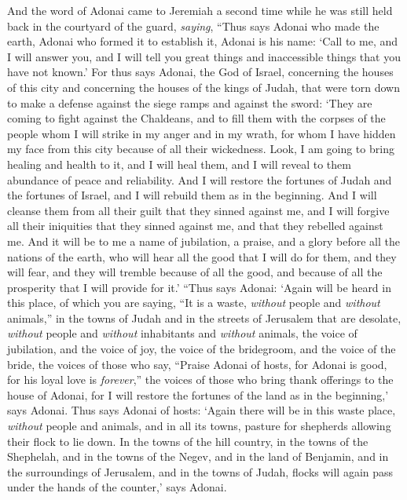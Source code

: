 \begin{biblechapter} %
 And the word of Adonai came to Jeremiah a second time while he was still held back in the courtyard of the guard, \textit{saying},
\verse “Thus says Adonai who made the earth, Adonai who formed it to establish it, Adonai is his name:
\verse ‘Call to me, and I will answer you, and I will tell you great things and inaccessible things that you have not known.’
\verse For thus says Adonai, the God of Israel, concerning the houses of this city and concerning the houses of the kings of Judah, that were torn down to make a defense against the siege ramps and against the sword:
\verse ‘They are coming to fight against the Chaldeans, and to fill them with the corpses of the people whom I will strike in my anger and in my wrath, for whom I have hidden my face from this city because of all their wickedness.
\verse Look, I am going to bring healing and health to it, and I will heal them, and I will reveal to them abundance of peace and reliability.
\verse And I will restore the fortunes of Judah and the fortunes of Israel, and I will rebuild them as in the beginning.
\verse And I will cleanse them from all their guilt that they sinned against me, and I will forgive all their iniquities that they sinned against me, and that they rebelled against me.
\verse And it will be to me a name of jubilation, a praise, and a glory before all the nations of the earth, who will hear all the good that I will do for them, and they will fear, and they will tremble because of all the good, and because of all the prosperity that I will provide for it.’
\verse “Thus says Adonai: ‘Again will be heard in this place, of which you are saying, “It is a waste, \textit{without} people and \textit{without} animals,” in the towns of Judah and in the streets of Jerusalem that are desolate, \textit{without} people and \textit{without} inhabitants and \textit{without} animals,
\verse the voice of jubilation, and the voice of joy, the voice of the bridegroom, and the voice of the bride, the voices of those who say, “Praise Adonai of hosts, for Adonai is good, for his loyal love is \textit{forever},” the voices of those who bring thank offerings to the house of Adonai, for I will restore the fortunes of the land as in the beginning,’ says Adonai.
\verse Thus says Adonai of hosts: ‘Again there will be in this waste place, \textit{without} people and animals, and in all its towns, pasture for shepherds allowing their flock to lie down.
\verse In the towns of the hill country, in the towns of the Shephelah, and in the towns of the Negev, and in the land of Benjamin, and in the surroundings of Jerusalem, and in the towns of Judah, flocks will again pass under the hands of the counter,’ says Adonai.

\end{biblechapter}
